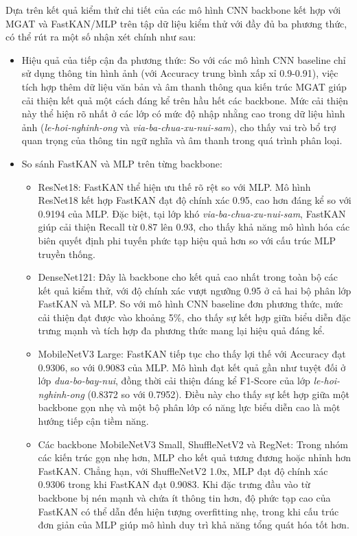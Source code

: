 \indent Dựa trên kết quả kiểm thử chi tiết của các mô hình CNN backbone kết hợp với MGAT và FastKAN/MLP trên tập dữ liệu kiểm thử với đầy đủ ba phương thức, có thể rút ra một số nhận xét chính như sau:\vspace{-0.1cm}
\begin{itemize}[label={--}, itemsep=1pt]
    \item Hiệu quả của tiếp cận đa phương thức: So với các mô hình CNN baseline chỉ sử dụng thông tin hình ảnh (với Accuracy trung bình xấp xỉ 0.9-0.91), việc tích hợp thêm dữ liệu văn bản và âm thanh thông qua kiến trúc MGAT giúp cải thiện kết quả một cách đáng kể trên hầu hết các backbone. Mức cải thiện này thể hiện rõ nhất ở các lớp có mức độ nhập nhằng cao trong dữ liệu hình ảnh (\textit{le-hoi-nghinh-ong} và \textit{via-ba-chua-xu-nui-sam}), cho thấy vai trò bổ trợ quan trọng của thông tin ngữ nghĩa và âm thanh trong quá trình phân loại.
    
    \item So sánh FastKAN và MLP trên từng backbone:\vspace{-0.1cm}
    \begin{itemize}[label={+}, itemsep=1pt]
        \item ResNet18: FastKAN thể hiện ưu thế rõ rệt so với MLP. Mô hình ResNet18 kết hợp FastKAN đạt độ chính xác 0.95, cao hơn đáng kể so với 0.9194 của MLP. Đặc biệt, tại lớp khó \textit{via-ba-chua-xu-nui-sam}, FastKAN giúp cải thiện Recall từ 0.87 lên 0.93, cho thấy khả năng mô hình hóa các biên quyết định phi tuyến phức tạp hiệu quả hơn so với cấu trúc MLP truyền thống.
        \item DenseNet121: Đây là backbone cho kết quả cao nhất trong toàn bộ các kết quả kiểm thử, với độ chính xác vượt ngưỡng 0.95 ở cả hai bộ phân lớp FastKAN và MLP. So với mô hình CNN baseline đơn phương thức, mức cải thiện đạt được vào khoảng 5\%, cho thấy sự kết hợp giữa biểu diễn đặc trưng mạnh và tích hợp đa phương thức mang lại hiệu quả đáng kể.
        \item MobileNetV3 Large: FastKAN tiếp tục cho thấy lợi thế với Accuracy đạt 0.9306, so với 0.9083 của MLP. Mô hình đạt kết quả gần như tuyệt đối ở lớp \textit{dua-bo-bay-nui}, đồng thời cải thiện đáng kể F1-Score của lớp \textit{le-hoi-nghinh-ong} (0.8372 so với 0.7952). Điều này cho thấy sự kết hợp giữa một backbone gọn nhẹ và một bộ phân lớp có năng lực biểu diễn cao là một hướng tiếp cận tiềm năng.
        \item Các backbone MobileNetV3 Small, ShuffleNetV2 và RegNet: Trong nhóm các kiến trúc gọn nhẹ hơn, MLP cho kết quả tương đương hoặc nhỉnh hơn FastKAN. Chẳng hạn, với ShuffleNetV2 1.0x, MLP đạt độ chính xác 0.9306 trong khi FastKAN đạt 0.9083. Khi đặc trưng đầu vào từ backbone bị nén mạnh và chứa ít thông tin hơn, độ phức tạp cao của FastKAN có thể dẫn đến hiện tượng overfitting nhẹ, trong khi cấu trúc đơn giản của MLP giúp mô hình duy trì khả năng tổng quát hóa tốt hơn.
    \end{itemize}
\end{itemize}

